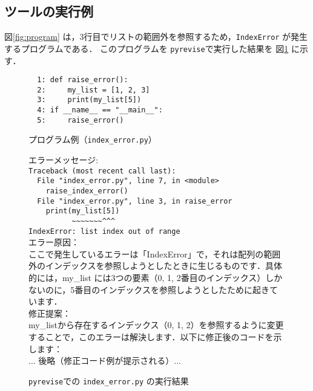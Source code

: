 \documentclass[12pt,twoside]{jbook}
\newcommand{\pyrevise}{\texttt{pyrevise}}
\begin{document}
\subsection{ツールの実行例}
図\ref{fig:program} は，3行目でリストの範囲外を参照するため，\texttt{IndexError} が発生するプログラムである．
このプログラムを \pyrevise で実行した結果を 図\ref{fig:result} に示す．

\begin{figure}[t]
  {\footnotesize
  \begin{boxedminipage}{1.02\columnwidth}
\verb!  1: def raise_error():!\\
\verb!  2:     my_list = [1, 2, 3]!\\
\verb!  3:     print(my_list[5])!\\
\verb!  4: if __name__ == "__main__":!\\
\verb!  5:     raise_error()!
\end{boxedminipage}}
  \caption{プログラム例（\texttt{index\_error.py}）}\label{fig:program}
  \vspace{0.2cm}
  {\footnotesize
  \begin{boxedminipage}{1.02\columnwidth}
エラーメッセージ:\\
\verb!Traceback (most recent call last):!\\
\verb!  File "index_error.py", line 7, in <module>!\\
\verb!    raise_index_error()!\\
\verb!  File "index_error.py", line 3, in raise_error!\\
\verb!    print(my_list[5])!\\
\verb!          ~~~~~~~^^^!\\
\verb!IndexError: list index out of range!\\
エラー原因：\\
ここで発生しているエラーは「IndexError」で，それは配列の範囲外のインデックスを参照しようとしたときに生じるものです．具体的には，my\_list には3つの要素（0, 1, 2番目のインデックス）しかないのに，5番目のインデックスを参照しようとしたために起きています．\\
修正提案：\\
my\_listから存在するインデックス（0, 1, 2）を参照するように変更することで，このエラーは解決します．以下に修正後のコードを示します：\\
... 後略（修正コード例が提示される）...



  \end{boxedminipage}}
  \caption{\pyrevise での \texttt{index\_error.py} の実行結果}\label{fig:result}
\end{figure}
\end{document}
